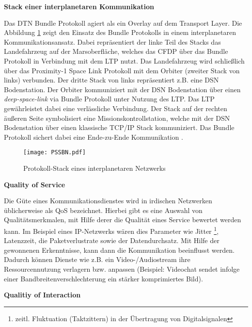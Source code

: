 \textbf{Stack einer interplanetaren Kommunikation}

Das \gls{DTN} Bundle Protokoll agiert als ein Overlay auf dem Transport Layer. Die
Abbildung \ref{fig:PSSBN} zeigt den Einsatz des Bundle Protokolls in einem
interplanetaren Kommunikationsansatz.
Dabei repr{\"a}sentiert der linke Teil des Stacks das Landefahrzeug auf der
Marsoberfl{\"a}che, welches das \gls{CFDP} {\"u}ber das Bundle Protokoll in
Verbindung mit dem \gls{LTP} nutzt.
Das Landefahrzeug wird schlie{\ss}lich {\"u}ber das Proximity-1 Space Link
Protokoll mit dem Orbiter (zweiter Stack von links) verbunden. Der dritte Stack
von links repr{\"a}sentiert z.B. eine \gls{DSN} Bodenstation. Der
Orbiter kommuniziert mit der \gls{DSN} Bodenstation {\"u}ber einen
\textit{deep-space-link} via Bundle Protokoll unter Nutzung des \gls{LTP}. Das
\gls{LTP} gew{\"a}hrleistet dabei eine verl{\"a}ssliche Verbindung. Der Stack
auf der rechten {\"a}u{\ss}eren Seite symbolisiert eine Missionskontrollstation,
welche mit der \gls{DSN} Bodenstation {\"u}ber einen klassische
\gls{TCP}/\gls{IP} Stack kommuniziert. Das Bundle Protokoll sichert dabei eine
Ende-zu-Ende Kommunikation \cite{DTNBundle}.

\begin{figure}[H]
	\centering
	\texttt{[image: PSSBN.pdf]}
	\caption[Protokoll-Stack eines interplanetaren Netzwerks]
	{Protokoll-Stack eines interplanetaren Netzwerks \cite{DTNBundle}}
	\label{fig:PSSBN}
\end{figure}

\textbf{Quality of Service}

Die G{\"u}te eines Kommunikationsdienstes wird in irdischen Netzwerken
{\"u}blicherweise als \gls{QoS} bezeichnet. Hierbei gibt es eine
Auswahl von Qualit{\"a}tsmerkmalen, mit Hilfe derer die Qualit{\"a}t eines
Service bewertet werden kann. Im Beispiel eines IP-Netzwerks w{\"a}ren dies
Parameter wie Jitter \footnote{zeitl. Fluktuation (Taktzittern) in der
{\"U}bertragung von Digitalsignalen}, Latenzzeit, die Paketverlustrate sowie der
Datendurchsatz. Mit Hilfe der gewonnenen Erkenntnisse, kann dann die
Kommunikation beeinflusst werden. Dadurch k{\"o}nnen Dienste wie z.B. ein
Video-/Audiostream ihre Ressourcennutzung verlagern bzw. anpassen
(Beispiel: Videochat sendet infolge einer Bandbreitenverschlechterung ein
st{\"a}rker komprimiertes Bild). 

\textbf{Qualitiy of Interaction} 

